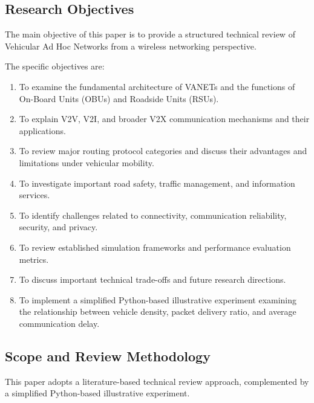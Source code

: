 \subsection{Research Objectives}

The main objective of this paper
is to provide a structured
technical review of
Vehicular Ad Hoc Networks
from a wireless networking
perspective.

The specific objectives are:

\begin{enumerate}

\item To examine the fundamental
architecture of VANETs and
the functions of On-Board Units
(OBUs) and Roadside Units (RSUs).

\item To explain V2V, V2I,
and broader V2X communication
mechanisms and their applications.

\item To review major routing
protocol categories and discuss
their advantages and limitations
under vehicular mobility.

\item To investigate important
road safety, traffic management,
and information services.

\item To identify challenges
related to connectivity,
communication reliability,
security, and privacy.

\item To review established
simulation frameworks and
performance evaluation metrics.

\item To discuss important
technical trade-offs and
future research directions.

\item To implement a simplified
Python-based illustrative experiment
examining the relationship between
vehicle density, packet delivery ratio,
and average communication delay.

\end{enumerate}

\subsection{Scope and Review Methodology}

This paper adopts a
literature-based technical
review approach, complemented
by a simplified Python-based
illustrative experiment.

